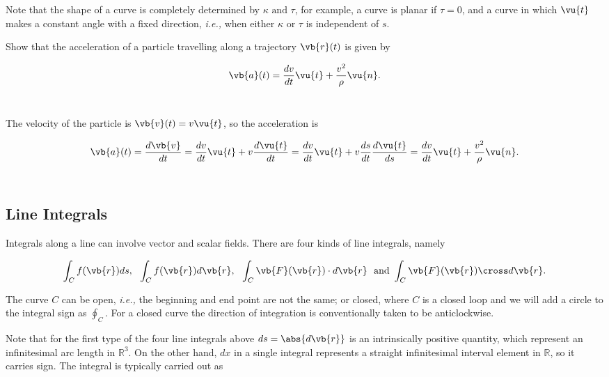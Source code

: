 \documentclass[english,a4paper,12pt]{report}
\begin{document}
Note that the shape of a curve is completely determined by \(\kappa \text { and } \tau \), for example, a curve is planar if \(\tau = 0\), and a curve in which \(\vu{t} \) makes a constant angle with a fixed direction, \textit{i.e.,} when either \(\kappa \text { or } \tau \) is independent of \(s\). 



{Show that the acceleration of a particle travelling along a trajectory \(\vb{r} (t)\) is given by 

\begin{equation}
	\vb{a} (t) = \frac{dv}{dt} \vu{t} + \frac{v^2}{\rho } \vu{n} .  
\end{equation}
~
}
{The velocity of the particle is \(\vb{v} (t) = v \vu{t} \), so the acceleration is 

\begin{equation}
	\vb{a} (t) = \frac{d\vb{v} }{dt} = \frac{dv}{dt} \vu{t} + v \frac{d \vu{t} }{dt} = \frac{dv}{dt}\vu{t} + v \frac{ds}{dt}\frac{d \vu{t} }{ds} = \frac{dv}{dt} \vu{t} + \frac{v^2}{\rho }\vu{n} .       
\end{equation}
~
}

\subsection{Line Integrals}

Integrals along a line can involve vector and scalar fields. There are four kinds of line integrals, namely

\begin{equation}
	\int _{C} f(\vb{r} ) ds, ~~ \int_{C}^{} f(\vb{r} ) d\vb{r} , ~~ \int_{C}^{} \vb{F} (\vb{r} ) \cdot d\vb{r} ~ \text { and }  \int_{C}^{} \vb{F} (\vb{r} ) \cross d\vb{r} . 
\end{equation}

The curve \(C\) can be open, \textit{i.e.,} the beginning and end point are not the same; or closed, where \(C\) is a closed loop and we will add a circle to the integral sign as \(\oint_{C} \). For a closed curve the direction of integration is conventionally taken to be anticlockwise.

Note that for the first type of the four line integrals above \(ds = \abs{d \vb{r} } \) is an intrinsically positive quantity, which represent an infinitesimal arc length in \(\mathbb{R}^3 \). On the other hand, \(dx\) in a single integral represents a straight infinitesimal interval element in \(\mathbb{R}\), so it carries sign. The integral is typically carried out as
\end{document}
